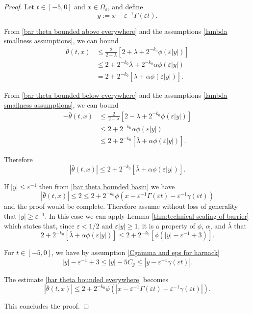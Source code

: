 \documentclass[11pt]{amsart}
\theoremstyle{remark}
\theoremstyle{definition}
\newcommand{\eps}{\varepsilon}
\newcommand{\bracket}[1]{\left[ #1 \right]}
\newcommand{\abs}[1]{\left\lvert #1 \right\rvert}
\newcommand{\n}{^{-1}}
\newcommand{\Cgamma}{C_g}
\begin{document}
\begin{proof}
Let $t \in [-5,0]$ and $x \in \Omega_\eps$, and define 
\[ y := x - \eps\n \Gamma(\eps t). \]

From \eqref{bar theta bounded above everywhere} and the assumptions \eqref{lambda smallness assumptions}, we can bound
\begin{align*} 
\bar{\theta}(t,x) &\leq \frac{2}{2-\lambda} \bracket{2 + \lambda + 2^{-k_0} \phi(\eps |y|)}
\\ &\leq 2 + 2^{-k_0} \bar{\lambda} + 2^{-k_0} \alpha \phi(\eps |y|)
\\ &= 2 + 2^{-k_0} \bracket{\bar{\lambda} + \alpha \phi(\eps |y|)}.
\end{align*}

From \eqref{bar theta bounded below everywhere} and the assumptions \eqref{lambda smallness assumptions}, we can bound
\begin{align*}
-\bar{\theta}(t,x) &\leq \frac{2}{2-\lambda} \bracket{2 -\lambda + 2^{-k_0} \phi(\eps |y|)}
\\ &\leq 2 + 2^{-k_0} \alpha \phi(\eps |y|)
\\ &\leq 2 + 2^{-k_0} \bracket{\bar{\lambda} + \alpha \phi(\eps |y|)}.
\end{align*}

Therefore
\begin{equation} \label{bar theta bounded everywhere} \abs{\bar{\theta}(t,x)} \leq 2 + 2^{-k_0} \bracket{\bar{\lambda} + \alpha \phi(\eps |y|)}. \end{equation}

If $|y| \leq \eps\n$ then from \eqref{bar theta bounded basin} we have
\[ \abs{\bar{\theta}(t,x)} \leq 2 \leq 2 + 2^{-k_0} \phi(x - \eps\n \Gamma(\eps t) - \eps\n \gamma(\eps t)) \]
and the proof would be complete.  Therefore assume without loss of generality that $|y|\geq \eps\n$.  In this case we can apply Lemma \ref{thm:technical scaling of barrier} which states that, since $\eps<1/2$ and $\eps|y| \geq 1$, it is a property of $\phi$, $\alpha$, and $\bar{\lambda}$ that
\[ 2 + 2^{-k_0} \bracket{\bar{\lambda} + \alpha \phi(\eps |y|)} \leq 2 + 2^{-k_0} \bracket{\phi(|y|-\eps\n + 3)}. \]

For $t \in [-5,0]$, we have by assumption \eqref{Cgamma and eps for harnack}
\[ |y|-\eps\n+3 \leq |y| - 5 \Cgamma \leq |y - \eps\n\gamma(\eps t)|. \]

The estimate \eqref{bar theta bounded everywhere} becomes
\[ \abs{\bar{\theta}(t,x)} \leq 2 + 2^{-k_0} \phi(|x - \eps\n\Gamma(\eps t) - \eps\n\gamma(\eps t)|). \]

This concludes the proof.  
\end{proof}
\end{document}
